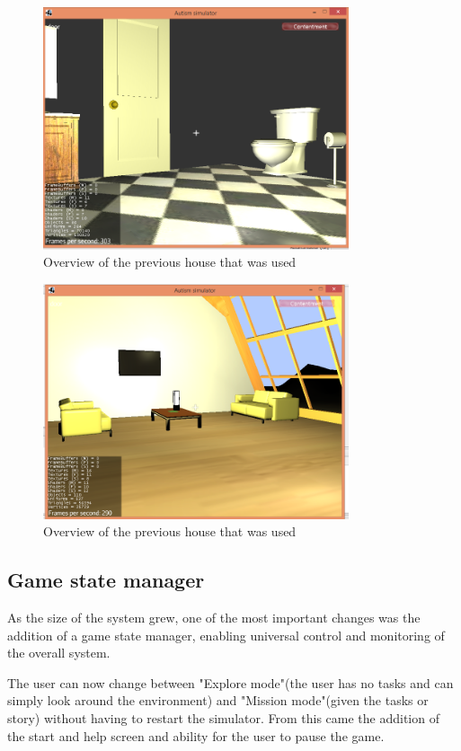 \documentclass[11pt]{report}
\begin{document}
\begin{figure}[H]
\centering
\includegraphics[width=90mm]{images/new_bathroom.png}
\caption{Overview of the previous house that was used}
\label{old_house}
\end{figure}

\begin{figure}[H]
\centering
\includegraphics[width=90mm]{images/new_livingroom.png}
\caption{Overview of the previous house that was used}
\label{old_house}
\end{figure}

\subsection{Game state manager}

As the size of the system grew, one of the most important changes was the addition of a game state manager, enabling universal control and monitoring of the overall system. 

The user can now change between "Explore mode"(the user has no tasks and can simply look around the environment) and "Mission mode"(given the tasks or story) without having to restart the simulator. From this came the addition of the start and help screen and ability for the user to pause the game.  
\end{document}
